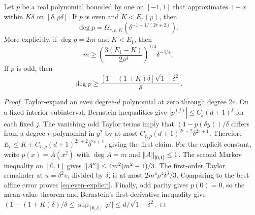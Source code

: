 \begin{proposition}\label{prop:parity-lower}
Let $p$ be a real polynomial bounded by one on $[-1,1]$ that approximates $1-x$ within $K\delta$ on $[\delta,\rho\delta]$. If $p$ is even and $K<E_r(\rho)$, then
\[
 \deg p=\Omega_{r,\rho,K}(\delta^{-1+1/(2r+2)}).
\]
More explicitly, if $\deg p=2m$ and $K<E_1$, then
\begin{equation}\label{eq:even-explicit}
 m\geq\left(\frac{3(E_1-K)}{2\rho^4}\right)^{1/4}\delta^{-3/4}.
\end{equation}
If $p$ is odd, then
\[
 \deg p\geq\frac{[1-(1+K)\delta]\sqrt{1-\delta^2}}{\delta}.
\]
\end{proposition}
\begin{proof}
Taylor-expand an even degree-$d$ polynomial at zero through degree $2r$. On a fixed interior subinterval, Bernstein inequalities give $|p^{(j)}|\leq C_j(d+1)^j$ for each fixed $j$. The vanishing odd Taylor terms imply that $(1-p(\delta y))/\delta$ differs from a degree-$r$ polynomial in $y^2$ by at most $C_{r,\rho}(d+1)^{2r+2}\delta^{2r+1}$. Therefore
$E_r\leq K+C_{r,\rho}(d+1)^{2r+2}\delta^{2r+1}$, giving the first claim.
For the explicit constant, write $p(x)=A(x^2)$ with $\deg A=m$ and $\left\lVert A\right\rVert_{[0,1]}\leq1$. The second Markov inequality on $[0,1]$ gives $\left\lVert A''\right\rVert\leq4m^2(m^2-1)/3$. The first-order Taylor remainder at $u=\delta^2v$, divided by $\delta$, is at most $2m^4\rho^4\delta^3/3$. Comparing to the best affine error proves \eqref{eq:even-explicit}. Finally, odd parity gives $p(0)=0$, so the mean-value theorem and Bernstein's first-derivative inequality give
$(1-(1+K)\delta)/\delta\leq\sup_{[0,\delta]}|p'|\leq d/\sqrt{1-\delta^2}$.
\end{proof}

